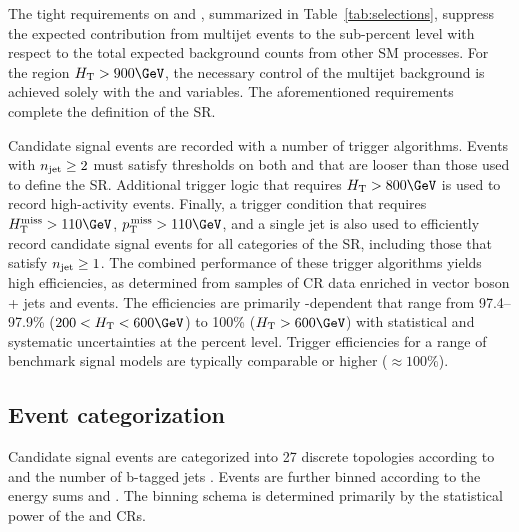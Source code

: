 The tight requirements on \alphat and \bdphi, summarized in
Table~\ref{tab:selections}, suppress the expected contribution from
multijet events to the sub-percent level with respect to the total
expected background counts from other SM processes. For the region
$\scalht > 900\GeV$, the necessary control of the multijet background
is achieved solely with the \bdphi and \bdphimod variables. The
aforementioned requirements complete the definition of the SR.

Candidate signal events are recorded with a number of trigger
algorithms. Events with $n_{\text{jet}} \geq 2$ must satisfy thresholds on both
\scalht and \alphat that are looser than those used to define the
SR. Additional trigger logic that requires $\scalht > 800\GeV$ is used
to record high-activity events. Finally, a trigger condition that
requires $\mht > 110\GeV$, $\ptmiss > 110\GeV$, and a single jet is
also used to efficiently record candidate signal events for all
categories of the SR, including those that satisfy $n_{\text{jet}} \geq 1$. The
combined performance of these trigger algorithms yields high
efficiencies, as determined from samples of CR data enriched in vector
boson + jets and \ttbar events. The efficiencies are primarily
\scalht-dependent that range from 97.4--97.9\% ($200 < \scalht <
600\GeV$) to 100\% ($\scalht > 600\GeV$) with statistical and
systematic uncertainties at the percent level. Trigger efficiencies
for a range of benchmark signal models are typically comparable or
higher (${\approx}100\%$).


\subsection{Event categorization}
\label{sec:categorization}

Candidate signal events are categorized into 27 discrete topologies
according to \njet and the number of b-tagged jets \nb. Events are
further binned according to the energy sums \scalht and \mht. The
binning schema is determined primarily by the statistical power of the
\mj and \mmj CRs. 

